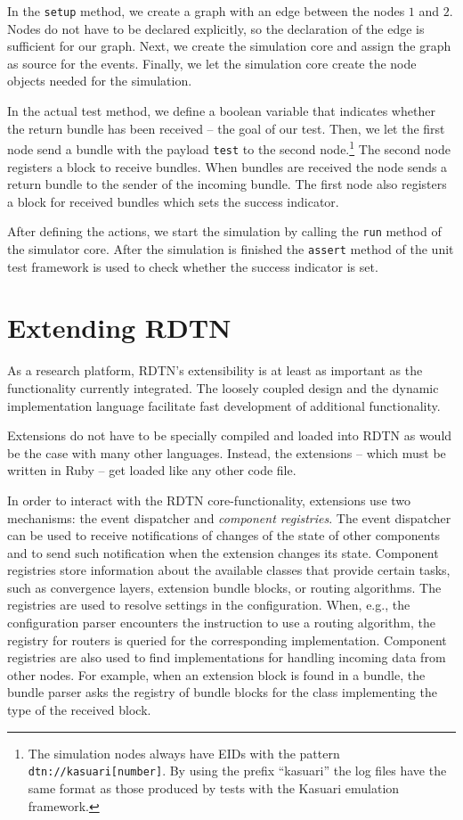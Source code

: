 \documentclass[a4paper]{article}
\begin{document}
In the {\tt setup} method, we create a graph with an edge between the nodes $1$
and $2$. Nodes do not have to be declared explicitly, so the declaration of the
edge is sufficient for our graph. Next, we create the simulation core and assign
the graph as source for the events. Finally, we let the simulation core create
the node objects needed for the simulation.

In the actual test method, we define a boolean variable that indicates whether
the return bundle has been received -- the goal of our test. Then, we let the
first node send a bundle with the payload {\tt test} to the second
node.\footnote{The simulation nodes always have EIDs with the pattern {\tt
dtn://kasuari[number]}. By using the prefix ``kasuari'' the log files have the
same format as those produced by tests with the Kasuari emulation framework.}
The second node registers a block to receive bundles. When bundles are received
the node sends a return bundle to the sender of the incoming bundle.
The first node also registers a block for received bundles which sets the
success indicator.

After defining the actions, we start the simulation by calling the {\tt run}
method of the simulator core. After the simulation is finished the {\tt assert}
method of the unit test framework is used to check whether the success indicator
is set.

\section{Extending RDTN}\label{sec.extending}

As a research platform, RDTN's extensibility is at least as important as the
functionality currently integrated. The loosely coupled design and the dynamic
implementation language facilitate fast development of additional functionality.

Extensions do not have to be specially compiled and loaded into RDTN as would be
the case with many other languages. Instead, the extensions -- which must be
written in Ruby -- get loaded like any other code file.

In order to interact with the RDTN core-functionality, extensions use two
mechanisms: the event dispatcher and {\em component registries}. The event
dispatcher can be used to receive notifications of changes of the state of other
components and to send such notification when the extension changes its state.
Component registries store information about the available classes that provide
certain tasks, such as convergence layers, extension bundle blocks, or routing
algorithms. The registries are used to resolve settings in the configuration.
When, e.g., the configuration parser encounters the instruction to use a routing
algorithm, the registry for routers is queried for the corresponding
implementation. Component registries are also used to find implementations for
handling incoming data from other nodes. For example, when an extension block is
found in a bundle, the bundle parser asks the registry of bundle blocks for the
class implementing the type of the received block.
\end{document}
